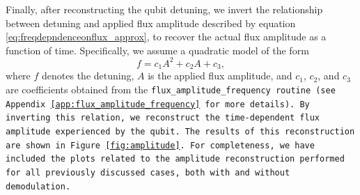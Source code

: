 Finally, after reconstructing the qubit detuning, we invert the relationship between detuning and applied flux amplitude described by equation \ref{eq:freqdepndenceonflux_approx}, to recover the actual flux amplitude as a function of time. 
Specifically, we assume a quadratic model of the form
\begin{equation}
    f = c_1 A^2 + c_2 A + c_3,
\end{equation}
where $f$ denotes the detuning, $A$ is the applied flux amplitude, and $c_1$, $c_2$, and $c_3$ are coefficients obtained from the \tt{flux\_amplitude\_frequency} routine (see Appendix \ref{app:flux_amplitude_frequency} for more details). 
By inverting this relation, we reconstruct the time-dependent flux amplitude experienced by the qubit. 
The results of this reconstruction are shown in Figure \ref{fig:amplitude}.
For completeness, we have included the plots related to the amplitude reconstruction performed for all previously discussed cases, both with and without demodulation.

